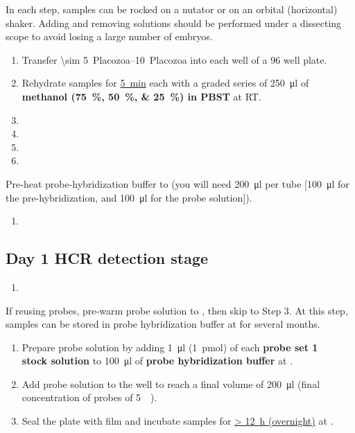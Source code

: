 \documentclass[10pt]{report}
\begin{document}
\alert{In each step, samples can be rocked on a nutator or on an orbital (horizontal) shaker.}
\alert{Adding and removing solutions should be performed under a dissecting scope to avoid losing a large number of embryos.}

\begin{enumerate}[series = steps]
	\item Transfer \qtyrange{\sim 5}{10}{Placozoa} into each well of a 96 well plate.
	\item Rehydrate samples for \underline{\qty{5}{\minute}} each with a graded series of \qty{250}{\ul} of \textbf{methanol (\qtylist{75;50;25}{\percent}) in PBST} at RT.
	\item {}
	\item {}
	\item {}
	\item {}
\end{enumerate}

\bigskip\alert{Pre-heat probe-hybridization buffer to \thirtysevendegree{} (you will need \qty{200}{\ul} per tube [\qty{100}{\ul} for the pre-hybridization, and \qty{100}{\ul} for the probe solution]).}

\begin{enumerate}[resume = steps]
	\item {}
\end{enumerate}

\subsection*{Day 1 \textendash{} HCR detection stage}
\begin{enumerate}[series = steps]
	\item {}
\end{enumerate}

\bigskip\alert{If reusing probes, pre-warm probe solution to \thirtysevendegree, then skip to Step 3.}
\alert{At this step, samples can be stored in probe hybridization buffer at \minustwenty{} for several months.}

\begin{enumerate}[resume = steps]
	\item Prepare probe solution by adding \qty{1}{\ul} (\qty{1}{\pmol}) of each \textbf{probe set \qty{1}{\micro\molar} stock solution} to \qty{100}{\ul} of \textbf{probe hybridization buffer} at \thirtysevendegree.
	\item Add probe solution to the well to reach a final volume of \qty{200}{\ul} (final concentration of probes of \qty{5}{\nano\molar}).
	\item Seal the plate with film and incubate samples for \underline{\qty{> 12}{\hour} (overnight)} at \thirtysevendegree.
\end{enumerate}
\end{document}
